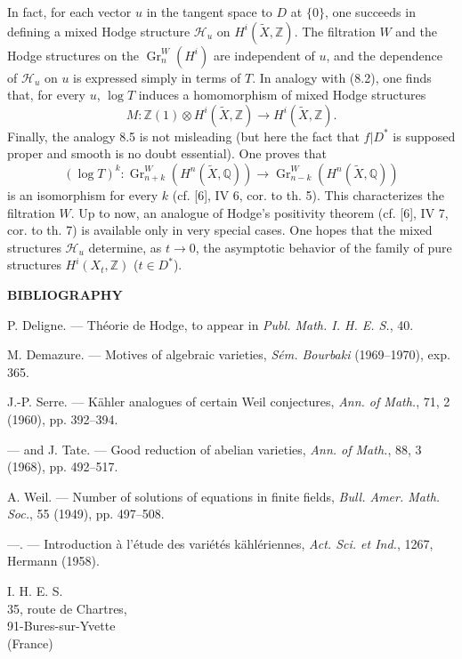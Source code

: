 \documentclass[10pt]{article}
\newcommand{\Q}{\mathbb Q}
\newcommand{\Z}{\mathbb Z}
\newcommand{\Gr}{\operatorname{Gr}}
\newcommand{\wt}{\widetilde}
\newcommand{\calH}{\mathcal H}
\begin{document}
In fact, for each vector $u$ in the tangent space to $D$ at $\{0\}$, one succeeds in defining a mixed Hodge structure $\calH_u$ on $H^i(\wt X,\Z)$. The filtration $W$ and the Hodge structures on the $\Gr_n^W(H^i)$ are independent of $u$, and the dependence of $\calH_u$ on $u$ is expressed simply in terms of $T$. In analogy with (8.2), one finds that, for every $u$, $\log T$ induces a homomorphism of mixed Hodge structures
\[
M:\Z(1)\otimes H^i(\wt X,\Z)\longrightarrow H^i(\wt X,\Z).
\]
Finally, the analogy 8.5 is not misleading (but here the fact that $f|D^*$ is supposed proper and smooth is no doubt essential). One proves that
\[
(\log T)^k:\Gr_{n+k}^W(H^n(\wt X,\Q))\longrightarrow\Gr_{n-k}^W(H^n(\wt X,\Q))
\]
is an isomorphism for every $k$ (cf. [6], IV 6, cor. to th. 5). This characterizes the filtration $W$. Up to now, an analogue of Hodge's positivity theorem (cf. [6], IV 7, cor. to th. 7) is available only in very special cases. One hopes that the mixed structures $\calH_u$ determine, as $t\to0$, the asymptotic behavior of the family of pure structures $H^i(X_t,\Z)$ ($t\in D^*$).

\begin{center}
\bfseries BIBLIOGRAPHY
\end{center}
\begin{enumerate}[label={[\arabic*]},leftmargin=2.2em,itemsep=0.1em]
\item P. Deligne. — Théorie de Hodge, to appear in \emph{Publ. Math. I. H. E. S.}, 40.
\item M. Demazure. — Motives of algebraic varieties, \emph{Sém. Bourbaki} (1969--1970), exp. 365.
\item J.-P. Serre. — Kähler analogues of certain Weil conjectures, \emph{Ann. of Math.}, 71, 2 (1960), pp. 392--394.
\item — and J. Tate. — Good reduction of abelian varieties, \emph{Ann. of Math.}, 88, 3 (1968), pp. 492--517.
\item A. Weil. — Number of solutions of equations in finite fields, \emph{Bull. Amer. Math. Soc.}, 55 (1949), pp. 497--508.
\item —. — Introduction à l'étude des variétés kählériennes, \emph{Act. Sci. et Ind.}, 1267, Hermann (1958).
\end{enumerate}

\begin{flushleft}
I. H. E. S.\\
35, route de Chartres,\\
91-Bures-sur-Yvette\\
(France)
\end{flushleft}
\end{document}
